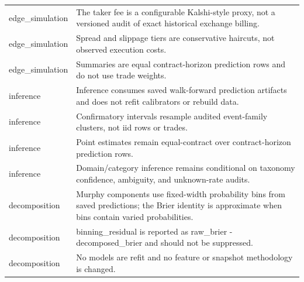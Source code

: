 \begin{tabular}{ll}
edge\_simulation & The taker fee is a configurable Kalshi-style proxy, not a versioned audit of exact historical exchange billing. \\
edge\_simulation & Spread and slippage tiers are conservative haircuts, not observed execution costs. \\
edge\_simulation & Summaries are equal contract-horizon prediction rows and do not use trade weights. \\
inference & Inference consumes saved walk-forward prediction artifacts and does not refit calibrators or rebuild data. \\
inference & Confirmatory intervals resample audited event-family clusters, not iid rows or trades. \\
inference & Point estimates remain equal-contract over contract-horizon prediction rows. \\
inference & Domain/category inference remains conditional on taxonomy confidence, ambiguity, and unknown-rate audits. \\
decomposition & Murphy components use fixed-width probability bins from saved predictions; the Brier identity is approximate when bins contain varied probabilities. \\
decomposition & binning\_residual is reported as raw\_brier - decomposed\_brier and should not be suppressed. \\
decomposition & No models are refit and no feature or snapshot methodology is changed. \\
\bottomrule
\end{tabular}
